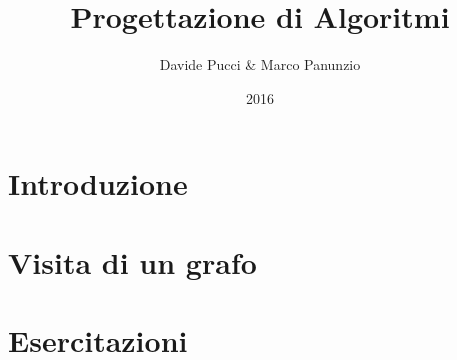 

\title{Progettazione di Algoritmi}
\author{Davide Pucci \& Marco Panunzio}
\date{2016}



\maketitle

\tableofcontents

\chapter{Introduzione}


\chapter{Visita di un grafo}


\chapter{Esercitazioni}


